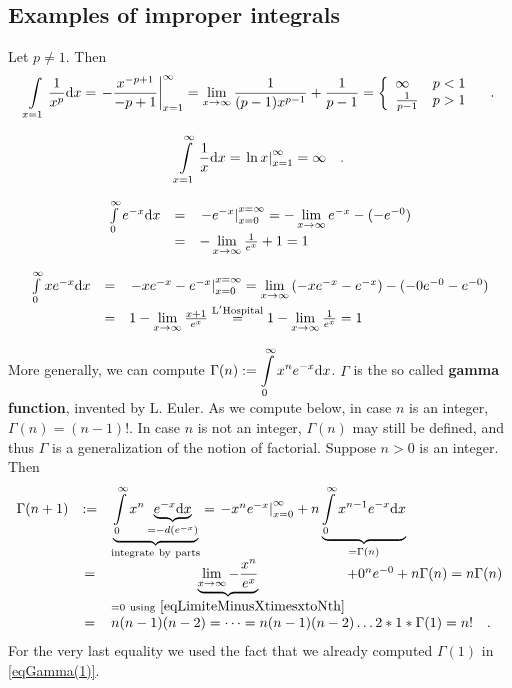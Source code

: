 \documentclass[12pt]{book}
\newcommand{\doublebrace}[4]{\left\{\begin{array}{ll} #1 & #2 \\#3 & #4  \end{array} \right.}
\renewcommand{\emph}{\textbf}
\begin{document}
\subsection{Examples of improper integrals}
Let $p\neq 1$. Then
\begin{equation}\label{eqIntegralxTopthPowerToInfty}
\int\limits_{x=1} \frac{1}{x^{p}} \diff x = \left.-\frac{x^{-p+1}}{-p+1}\right|_{x=1}^{\infty}= \lim\limits_{x\to\infty}
\frac{1}{(p-1) x^{p-1}}+\frac{1}{p-1} =\doublebrace{\infty}{p<1}{\frac{1}{p-1}}{p>1} \quad .
\end{equation}

\begin{equation}\label{eqIntegral1overxToToInfty}
\int\limits_{x=1}^{\infty} \frac{1}x {\normalfont \text{d}} x= \left.\ln x \right|_{x=1}^{\infty}= \infty\quad .
\end{equation}

\begin{equation}\label{eqGamma(1)}
\begin{array}{rcl}
\int\limits_{0}^{\infty}e^{-x}{\normalfont \text{d}} x&=& \left.- e^{-x}\right|_{x=0}^{x=\infty}=-\lim\limits_{x\to \infty}e^{-x}  - (-e^{-0})\\&=& -\lim \limits_{x\to \infty} \frac{1}{e^{x}} +1=1
\end{array}
\end{equation}


\[
\begin{array}{rcl}
\int\limits_{0}^{\infty}xe^{-x}{\normalfont \text{d}} x&=& \left.-xe^{-x} - e^{-x}\right|_{x=0}^{x=\infty}=\lim\limits_{x\to \infty}\left( -xe^{-x} -e^{-x}\right) - (-0e^{-0}-e^{-0})\\&=& 1-\lim \limits_{x\to \infty} \frac{x+1}{e^{x}}\stackrel{\mathrm{L'Hospital}}{=}1-\lim \limits_{x\to \infty} \frac{1}{e^{x}} =1
\end{array}
\]

More generally, we can compute $\Gamma (n):=\displaystyle\int\limits_{0}^{\infty} x^ne^{-x}{\normalfont \text{d}} x$. $\Gamma$ is the so called \emph{gamma function}, invented by L. Euler. As we compute below, in case $n$ is an integer, $\Gamma(n)=(n-1)!$. In case $n$ is not an integer, $\Gamma(n)$ may still be defined, and thus $\Gamma$ is a generalization of the notion of factorial. Suppose $n>0$ is an integer. Then
\[
\begin{array}{rcl}
\Gamma (n+1)&:=&\underbrace{\int\limits_{0}^{\infty} x^{n}\underbrace{e^{-x}{\normalfont \text{d}} x}_{=-d (e^{-x})}}_{\mathrm{integrate~by~parts}}=\left. -x^{n}e^{-x}\right|_{x=0}^{\infty}+ n\underbrace{\int\limits_{0}^{\infty}x^{n-1} e^{-x}{\normalfont \text{d}} x}_{=\Gamma(n)}\\
&=& \underbrace{\lim\limits_{x\to \infty} -\frac{x^{n}}{e^x}}_{=0\mathrm{~using~\eqref{eqLimiteMinusXtimesxtoNth}}}+ 0^ne^{-0}+n\Gamma(n)= n\Gamma(n)\\
&=& n(n-1)(n-2)=\dots =n(n-1)(n-2)\dots 2*1* \Gamma(1)= n!\quad .
\end{array}
\]
For the very last equality we used the fact that we already computed $\Gamma(1)$ in \eqref{eqGamma(1)}.
\end{document}
